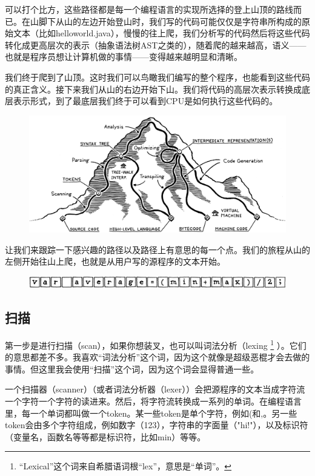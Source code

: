 \documentclass[cn,10pt,math=newtx,citestyle=gb7714-2015,bibstyle=gb7714-2015]{elegantbook}
\begin{document}
可以打个比方，这些路径都是每一个编程语言的实现所选择的登上山顶的路线而已。在山脚下从山的左边开始登山时，我们写的代码可能仅仅是字符串所构成的原始文本（比如helloworld.java），慢慢的往上爬，我们分析写的代码然后将这些代码转化成更高层次的表示（抽象语法树AST之类的），随着爬的越来越高，语义——也就是程序员想让计算机做的事情——变得越来越明显和清晰。

我们终于爬到了山顶。这时我们可以鸟瞰我们编写的整个程序，也能看到这些代码的真正含义。接下来我们从山的右边开始下山。我们将代码的高层次表示转换成底层表示形式，到了最底层我们终于可以看到CPU是如何执行这些代码的。

\begin{figure}[h]
\centering
\includegraphics[width=\textwidth]{./image/a-map-of-the-territory/mountain.png}
\end{figure}

让我们来跟踪一下感兴趣的路径以及路径上有意思的每一个点。我们的旅程从山的左侧开始往山上爬，也就是从用户写的源程序的文本开始。

\begin{figure}[h]
\centering
\includegraphics[width=\textwidth]{./image/a-map-of-the-territory/string.png}
\end{figure}

\subsection{扫描}

第一步是进行扫描（scan），如果你想装叉，也可以叫词法分析（lexing \footnote{“Lexical”这个词来自希腊语词根“lex”，意思是“单词”。} ）。它们的意思都差不多。我喜欢“词法分析”这个词，因为这个就像是超级恶棍才会去做的事情。但这里我会使用“扫描”这个词，因为这个词会显得普通一些。

一个扫描器（scanner）（或者词法分析器（lexer））会把源程序的文本当成字符流一个字符一个字符的读进来。然后，将字符流转换成一系列的单词。在编程语言里，每一个单词都叫做一个token。某一些token是单个字符，例如(和,。另一些token会由多个字符组成，例如数字（123），字符串的字面量（"hi!"），以及标识符（变量名，函数名等等都是标识符，比如min）等等。
\end{document}
